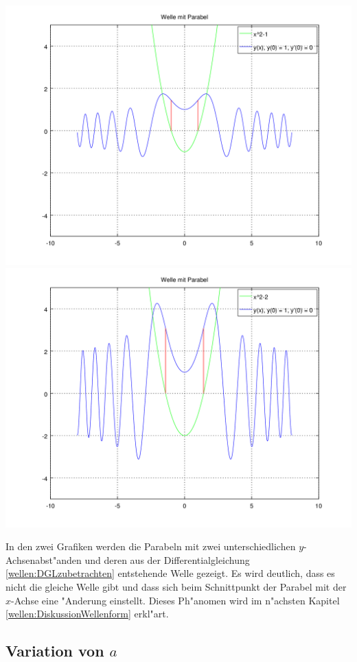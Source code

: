 \begin{refsection}
\noindent
\includegraphics[scale=0.35]{./wellen/octave/images/variationc/cneg1.png}
\includegraphics[scale=0.35]{./wellen/octave/images/variationc/cneg2.png}

In den zwei Grafiken werden die 
Parabeln mit zwei unterschiedlichen $y$-Achsenabst"anden und deren aus der 
Differentialgleichung \ref{wellen:DGLzubetrachten} entstehende Welle gezeigt. 
Es wird deutlich, dass es nicht die gleiche Welle gibt und dass sich beim 
Schnittpunkt der Parabel mit der $x$-Achse eine "Anderung einstellt. Dieses 
Ph"anomen wird im n"achsten Kapitel \ref{wellen:DiskussionWellenform} erkl"art. 

\subsection{Variation von $a$}
\label{wellen:Variationa}


\end{refsection}
